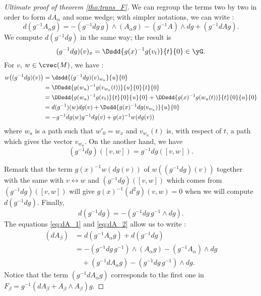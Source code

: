 \begin{proof}[Ultimate proof of theorem \ref{tho:trans_F}]
We can regroup the terms two by two in order to form $dA_{\alpha}$ and some wedge; with simpler notations, we can write :
\begin{equation}\label{eq:dA_1}
  d(g^{-1} A_{\alpha} g)=-(g^{-1} dg\,g)\wedge(A_{\alpha} g)-(g^{-1} A)\wedge dg+(g^{-1} dA g).
\end{equation}
We compute $d(g^{-1} dg)$ in the same way; the result is
\[
   (g^{-1} dg)(v)_x=\Dsdd{g(x)^{-1} g(v_t)}{t}{0}\in\yG.
\]
For $v$, $w\in\cvec(M)$, we have :
\begin{equation}
\begin{split}
   w\big((g^{-1} dg)(v)\big)&=\dsdd{ (g^{-1} dg)(v)_{w_u} }{u}{0}\\
                   &=\DDsdd{  g(w_u)^{-1} g(v_{w_u}(t))  }{u}{0}{t}{0}\\
		   &=\DDsdd{  g(w_u)^{-1} g(v_t)  }{t}{0}{u}{0}
		      +\DDsdd{  g(x)^{-1} g(w_u(t))  }{t}{0}{u}{0}\\
		   &=d(g^{-1})(w)dg(v)+\Dsdd{ g(x)^{-1} dg(v_{w_u}) }{u}{0}\\
		   &=-g^{-1} dg(w)g^{-1} dg(v)+g(x)^{-1} w(dg(v))
\end{split}
\end{equation}
where $w_u$ is a path such that $w'_0=w_x$ and $v_{w_u}(t)$ is, with respect of $t$, a path which gives the vector $v_{w_u}$. On the another hand, we have
\[
   (g^{-1} dg)([v,w])=g^{-1} dg([v,w]).
\]

Remark that the term $g(x)^{-1} w(dg(v))$ of  $w((g^{-1} dg)(v))$ together with the same with $v\leftrightarrow w$ and $(g^{-1} dg)([v,w])$ which comes from  $(g^{-1} dg)([v,w])$ will give $g(x)^{-1}(d^2g)(v,w)=0$ when we will compute $d(g^{-1} dg)$.
Finally,
\begin{equation}\label{eq:dA_2}
   d(g^{-1} dg)=-(g^{-1} dg\,g^{-1}\wedge dg).
\end{equation}
The equations \eqref{eq:dA_1} and \eqref{eq:dA_2} allow us to write :
\begin{equation}\label{eq:dA}
\begin{split}
    (dA_{\beta})&=d(g^{-1} A_{\alpha} g)+d(g^{-1} dg)\\
              &=-(g^{-1} dg\,g^{-1}) \wedge(A_{\alpha} g)-(g^{-1} A_{\alpha})\wedge dg\\
	      &\quad+(g^{-1} dA_{\alpha} g)-(g^{-1} dg\,g^{-1})\wedge dg.
\end{split}
\end{equation}
Notice that the term $(g^{-1} dA_{\alpha} g)$ corresponds to the first one in $F_{\beta}=g^{-1}(dA_{\beta}+A_{\beta}\wedge A_{\beta})g$.


\end{proof}
